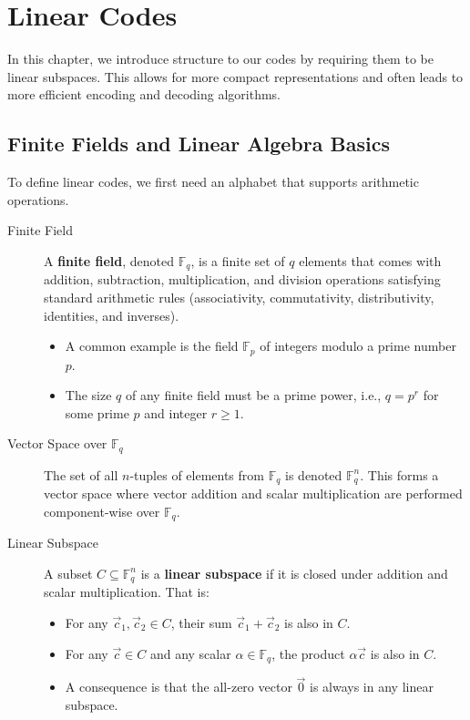 \section{Linear Codes}

In this chapter, we introduce structure to our codes by requiring them to be linear subspaces. This allows for more compact representations and often leads to more efficient encoding and decoding algorithms.

\subsection{Finite Fields and Linear Algebra Basics}

To define linear codes, we first need an alphabet that supports arithmetic operations.

\begin{description}
    \item[Finite Field] A \textbf{finite field}, denoted $\mathbb{F}_q$, is a 
        finite set of $q$ elements that comes with addition, subtraction, multiplication, 
        and division operations satisfying standard arithmetic rules (associativity, commutativity, distributivity, identities, and inverses).
    \begin{itemize}
        \item A common example is the field $\mathbb{F}_p$ of integers modulo a prime number $p$.
        \item The size $q$ of any finite field must be a prime power, i.e., $q = p^r$ for some prime $p$ and integer $r \ge 1$.
    \end{itemize}

    \item[Vector Space over $\mathbb{F}_q$] The set of all $n$-tuples of elements from $\mathbb{F}_q$ is denoted $\mathbb{F}_q^n$. This forms a vector space where vector addition and scalar multiplication are performed component-wise over $\mathbb{F}_q$.

    \item[Linear Subspace] A subset $C \subseteq \mathbb{F}_q^n$ is a \textbf{linear subspace} if it is closed under addition and scalar multiplication. That is:
    \begin{itemize}
        \item For any $\vec{c}_1, \vec{c}_2 \in C$, their sum $\vec{c}_1 + \vec{c}_2$ is also in $C$.
        \item For any $\vec{c} \in C$ and any scalar $\alpha \in \mathbb{F}_q$, the product $\alpha\vec{c}$ is also in $C$.
        \item A consequence is that the all-zero vector $\vec{0}$ is always in any linear subspace.
    \end{itemize}
\end{description}

